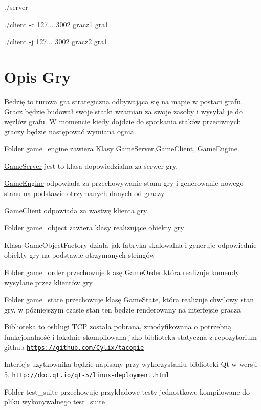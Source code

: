 \begin{DoxyItemize}
\item ./server
\item ./client -\/c 127... 3002 gracz1 gra1
\item ./client -\/j 127... 3002 gracz2 gra1
\end{DoxyItemize}

\section*{Opis Gry}

Bedzię to turowa gra strategiczna odbywająca się na mapie w postaci grafu. Gracz będzie budował swoje statki wzamian za swoje zasoby i wysyłał je do węzłów grafu. W momencie kiedy dojdzie do spotkania staków przeciwnych graczy będzie następować wymiana ognia.


\begin{DoxyItemize}
\item Folder game\+\_\+engine zawiera Klasy \hyperlink{classGameServer}{Game\+Server},\hyperlink{classGameClient}{Game\+Client}, \hyperlink{classGameEngine}{Game\+Engine}.
\end{DoxyItemize}

\hyperlink{classGameServer}{Game\+Server} jest to klasa dopowiedzialna za serwer gry.

\hyperlink{classGameEngine}{Game\+Engine} odpowiada za przechowywanie stanu gry i generowanie nowego stanu na podstawie otrzymanych danych od graczy

\hyperlink{classGameClient}{Game\+Client} odpowiada za wastwę klienta gry


\begin{DoxyItemize}
\item Folder game\+\_\+object zawiera klasy realizujące obiekty gry
\end{DoxyItemize}

Klasa Game\+Object\+Factory działa jak fabryka skalowalna i generuje odpowiednie obiekty gry na podstawie otrzymanych stringów
\begin{DoxyItemize}
\item Folder game\+\_\+order przechowuje klasę Game\+Order która realizuje komendy wysyłane przez klientów gry
\item Folder game\+\_\+state przechowuje klasę Game\+State, która realizuje chwilowy stan gry, w póżniejszym czasie stan ten będzie renderowany na interfejsie gracza
\item Biblioteka to osbługi T\+CP została pobrana, zmodyfikowana o potrzebną funkcjonalność i lokalnie skompilowana jako biblioteka statyczna z repozytorium github \href{https://github.com/Cylix/tacopie}{\tt https\+://github.\+com/\+Cylix/tacopie}
\item Interfejs uzytkownika będzie napisany przy wykorzystaniu biblioteki Qt w wersji 5. \href{http://doc.qt.io/qt-5/linux-deployment.html}{\tt http\+://doc.\+qt.\+io/qt-\/5/linux-\/deployment.\+html}
\item Folder test\+\_\+suite przechowuje przykładowe testy jednostkowe kompilowane do pliku wykonywalnego test\+\_\+suite 
\end{DoxyItemize}